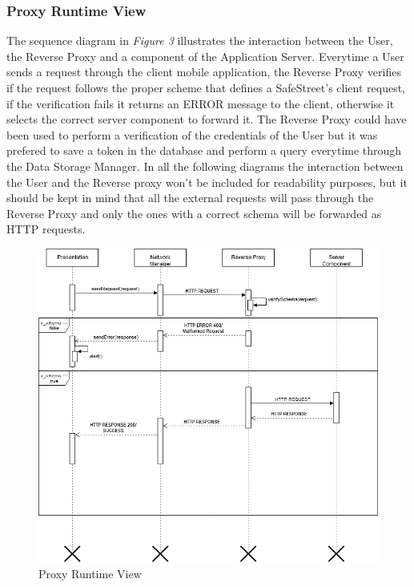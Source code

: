 \subsubsection{Proxy Runtime View}
The sequence diagram in \textit{Figure 3} illustrates the interaction between the User, the Reverse Proxy and a component of the Application Server. Everytime a User sends a request through the client mobile application, the Reverse Proxy verifies if the request follows the proper scheme that defines a SafeStreet's client request, if the verification fails it returns an ERROR message to the client, otherwise it selects the correct server component to forward it. The Reverse Proxy could have been used to perform a verification of the credentials of the User but it was prefered to save a token in the database and perform a query everytime through the Data Storage Manager. In all the following diagrams the interaction between the User and the Reverse proxy won't be included for readability purposes, but it should be kept in mind that all the external requests will pass through the Reverse Proxy and only the ones with a correct schema will be forwarded as HTTP requests.
\begin{figure}[H]
          \includegraphics[scale=0.55]{Images/seq_proxy2.png}
        \caption{Proxy Runtime View}
\end{figure}

